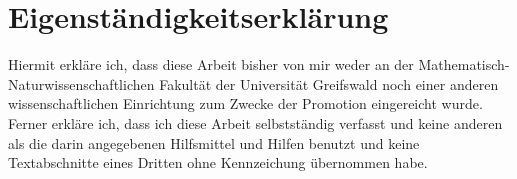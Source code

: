 \thispagestyle{empty}
\section*{Eigenständigkeitserklärung}
Hiermit erkläre ich, dass diese Arbeit bisher von mir weder an der Ma\-the\-ma\-tisch-Naturwissenschaftlichen Fakultät der Universität Greifswald noch einer anderen wissenschaftlichen Einrichtung zum Zwecke der Promotion eingereicht wurde.
Ferner erkläre ich, dass ich diese Arbeit selbstständig verfasst und keine anderen als die darin angegebenen Hilfsmittel und Hilfen benutzt und keine Textabschnitte eines Dritten ohne Kennzeichung übernommen habe.

